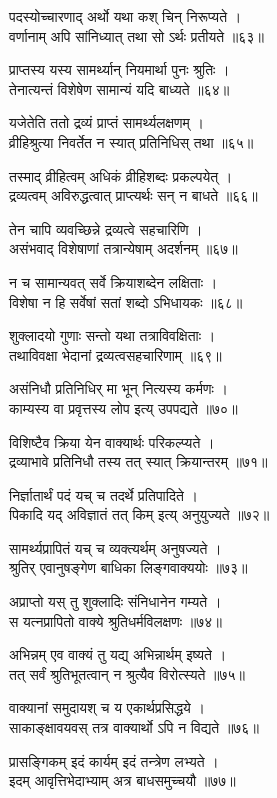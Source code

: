 पदस्योच्चारणाद् अर्थो यथा कश् चिन् निरूप्यते ।\\वर्णानाम् अपि सांनिध्यात् तथा सो ऽर्थः प्रतीयते ॥६३॥

प्राप्तस्य यस्य सामर्थ्यान् नियमार्था पुनः श्रुतिः ।\\तेनात्यन्तं विशेषेण सामान्यं यदि बाध्यते ॥६४॥

यजेतेति ततो द्रव्यं प्राप्तं सामर्थ्यलक्षणम् ।\\व्रीहिश्रुत्या निवर्तेत न स्यात् प्रतिनिधिस् तथा ॥६५॥

तस्माद् व्रीहित्वम् अधिकं व्रीहिशब्दः प्रकल्पयेत् ।\\द्रव्यत्वम् अविरुद्धत्वात् प्राप्त्यर्थः सन् न बाधते ॥६६॥

तेन चापि व्यवच्छिन्ने द्रव्यत्वे सहचारिणि ।\\असंभवाद् विशेषाणां तत्रान्येषाम् अदर्शनम् ॥६७॥

न च सामान्यवत् सर्वे क्रियाशब्देन लक्षिताः ।\\विशेषा न हि सर्वेषां सतां शब्दो ऽभिधायकः ॥६८॥

शुक्लादयो गुणाः सन्तो यथा तत्राविवक्षिताः ।\\तथाविवक्षा भेदानां द्रव्यत्वसहचारिणाम् ॥६९॥

असंनिधौ प्रतिनिधिर् मा भून् नित्यस्य कर्मणः ।\\काम्यस्य वा प्रवृत्तस्य लोप इत्य् उपपद्यते ॥७०॥

विशिष्टैव क्रिया येन वाक्यार्थः परिकल्प्यते ।\\द्रव्याभावे प्रतिनिधौ तस्य तत् स्यात् क्रियान्तरम् ॥७१॥

निर्ज्ञातार्थं पदं यच् च तदर्थे प्रतिपादिते ।\\पिकादि यद् अविज्ञातं तत् किम् इत्य् अनुयुज्यते ॥७२॥

सामर्थ्यप्रापितं यच् च व्यक्त्यर्थम् अनुषज्यते ।\\श्रुतिर् एवानुषङ्गेण बाधिका लिङ्गवाक्ययोः ॥७३॥

अप्राप्तो यस् तु शुक्लादिः संनिधानेन गम्यते ।\\स यत्नप्रापितो वाक्ये श्रुतिधर्मविलक्षणः ॥७४॥

अभिन्नम् एव वाक्यं तु यद्य् अभिन्नार्थम् इष्यते ।\\तत् सर्वं श्रुतिभूतत्वान् न श्रुत्यैव विरोत्स्यते ॥७५॥

वाक्यानां समुदायश् च य एकार्थप्रसिद्धये ।\\साकाङ्क्षावयवस् तत्र वाक्यार्थो ऽपि न विद्यते ॥७६॥

प्रासङ्गिकम् इदं कार्यम् इदं तन्त्रेण लभ्यते ।\\इदम् आवृत्तिभेदाभ्याम् अत्र बाधसमुच्चयौ ॥७७॥

